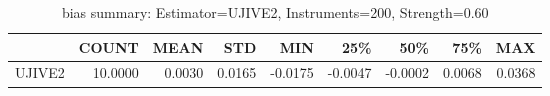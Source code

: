 \begin{table}[ht]
\centering
\caption{bias summary: Estimator=UJIVE2, Instruments=200, Strength=0.60}
\begin{tabular}{lrrrrrrrr}
\toprule
 & COUNT & MEAN & STD & MIN & 25\% & 50\% & 75\% & MAX \\
\midrule
UJIVE2 & 10.0000 & 0.0030 & 0.0165 & -0.0175 & -0.0047 & -0.0002 & 0.0068 & 0.0368 \\
\bottomrule
\end{tabular}
\end{table}
